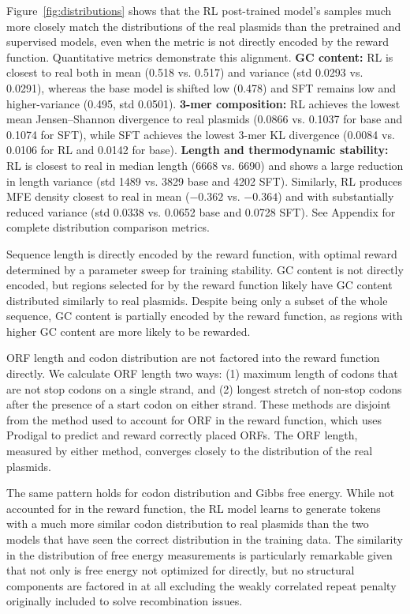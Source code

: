 \documentclass{article}
\theoremstyle{plain}
\theoremstyle{definition}
\theoremstyle{remark}
\begin{document}
Figure~\ref{fig:distributions} shows that the RL post-trained model's
samples much more closely match the distributions of the real plasmids
than the pretrained and supervised models, even when the metric is not
directly encoded by the reward function. Quantitative metrics demonstrate
this alignment. \textbf{GC content:} RL is closest to real both in mean
(0.518 vs. 0.517) and variance (std 0.0293 vs. 0.0291), whereas the base
model is shifted low (0.478) and SFT remains low and higher-variance
(0.495, std 0.0501). \textbf{3-mer composition:} RL achieves the lowest
mean Jensen--Shannon divergence to real plasmids (0.0866 vs. 0.1037 for
base and 0.1074 for SFT), while SFT achieves the lowest 3-mer KL
divergence (0.0084 vs. 0.0106 for RL and 0.0142 for base). \textbf{Length
and thermodynamic stability:} RL is closest to real in median length
(6668 vs. 6690) and shows a large reduction in length variance (std 1489
vs. 3829 base and 4202 SFT). Similarly, RL produces MFE density closest
to real in mean ($-0.362$ vs. $-0.364$) and with substantially reduced
variance (std 0.0338 vs. 0.0652 base and 0.0728 SFT). See Appendix for
complete distribution comparison metrics.

Sequence length is directly encoded by the reward function, with optimal
reward determined by a parameter sweep for training stability. GC
content is not directly encoded, but regions selected for by the reward
function likely have GC content distributed similarly to real plasmids. 
Despite being only a subset of the whole sequence, GC
content is partially encoded by the reward function, as regions with higher GC content are more likely to be rewarded.

ORF length and codon distribution are not factored into the reward
function directly. We calculate ORF length two ways: (1) maximum length
of codons that are not stop codons on a single strand, and (2) longest
stretch of non-stop codons after the presence of a start codon on either
strand. These methods are disjoint from the method used to account for
ORF in the reward function, which uses Prodigal \cite{prodigal} to
predict and reward correctly placed ORFs. The ORF length, measured by
either method, converges closely to the distribution of the real
plasmids.

The same pattern holds for codon distribution and Gibbs free energy.
While not accounted for in the reward function, the RL model learns to
generate tokens with a much more similar codon distribution to real
plasmids than the two models that have seen the correct distribution in
the training data. The similarity in the distribution of free energy
measurements is particularly remarkable given that not only is free
energy not optimized for directly, but no structural components are
factored in at all excluding the weakly correlated repeat penalty 
originally included to solve recombination issues.
\end{document}

